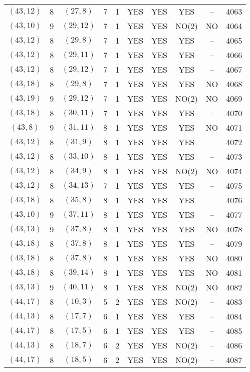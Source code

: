 \begin{longtable}{|c|c|c|c|c|c|c|c|c|c|}
$(43, 12)$ & 8 & $(27, 8)$ & 7 & 1 & YES & YES & YES & -- & 4063\\
$(43, 10)$ & 9 & $(29, 12)$ & 7 & 1 & YES & YES & NO(2) & NO & 4064\\
$(43, 12)$ & 8 & $(29, 8)$ & 7 & 1 & YES & YES & YES & -- & 4065\\
$(43, 12)$ & 8 & $(29, 11)$ & 7 & 1 & YES & YES & YES & -- & 4066\\
$(43, 12)$ & 8 & $(29, 12)$ & 7 & 1 & YES & YES & YES & -- & 4067\\
$(43, 18)$ & 8 & $(29, 8)$ & 7 & 1 & YES & YES & YES & NO & 4068\\
$(43, 19)$ & 9 & $(29, 12)$ & 7 & 1 & YES & YES & NO(2) & NO & 4069\\
$(43, 18)$ & 8 & $(30, 11)$ & 7 & 1 & YES & YES & YES & -- & 4070\\
$(43, 8)$ & 9 & $(31, 11)$ & 8 & 1 & YES & YES & YES & NO & 4071\\
$(43, 12)$ & 8 & $(31, 9)$ & 8 & 1 & YES & YES & YES & -- & 4072\\
$(43, 12)$ & 8 & $(33, 10)$ & 8 & 1 & YES & YES & YES & -- & 4073\\
$(43, 12)$ & 8 & $(34, 9)$ & 8 & 1 & YES & YES & NO(2) & NO & 4074\\
$(43, 12)$ & 8 & $(34, 13)$ & 7 & 1 & YES & YES & YES & -- & 4075\\
$(43, 18)$ & 8 & $(35, 8)$ & 8 & 1 & YES & YES & YES & -- & 4076\\
$(43, 10)$ & 9 & $(37, 11)$ & 8 & 1 & YES & YES & YES & -- & 4077\\
$(43, 13)$ & 9 & $(37, 8)$ & 8 & 1 & YES & YES & YES & NO & 4078\\
$(43, 18)$ & 8 & $(37, 8)$ & 8 & 1 & YES & YES & YES & -- & 4079\\
$(43, 18)$ & 8 & $(37, 8)$ & 8 & 1 & YES & YES & YES & NO & 4080\\
$(43, 18)$ & 8 & $(39, 14)$ & 8 & 1 & YES & YES & YES & NO & 4081\\
$(43, 13)$ & 9 & $(40, 11)$ & 8 & 1 & YES & YES & NO(2) & NO & 4082\\
$(44, 17)$ & 8 & $(10, 3)$ & 5 & 2 & YES & YES & NO(2) & -- & 4083\\
$(44, 13)$ & 8 & $(17, 7)$ & 6 & 1 & YES & YES & YES & -- & 4084\\
$(44, 17)$ & 8 & $(17, 5)$ & 6 & 1 & YES & YES & YES & -- & 4085\\
$(44, 13)$ & 8 & $(18, 7)$ & 6 & 2 & YES & YES & NO(2) & -- & 4086\\
$(44, 17)$ & 8 & $(18, 5)$ & 6 & 2 & YES & YES & NO(2) & -- & 4087\\

\end{longtable}
